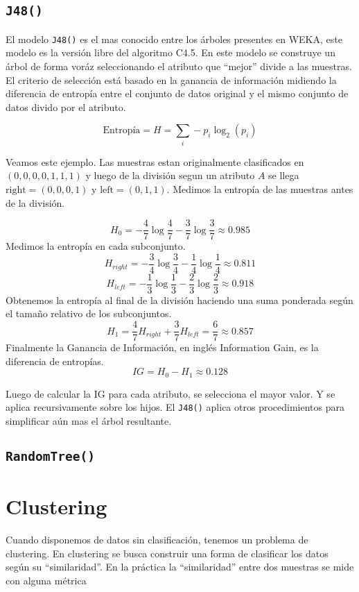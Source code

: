 \documentclass[10pt,a4paper]{article}
\begin{document}
\subsection{\lstinline{J48()}}
El modelo \lstinline{J48()} es el mas conocido entre los árboles presentes en WEKA, este modelo es la versión libre del algoritmo C4.5. En este modelo se construye un árbol de forma voráz seleccionando el atributo que ``mejor'' divide a las muestras. El criterio de selección está basado en la ganancia de información midiendo la diferencia de entropía entre el conjunto de datos original y el mismo conjunto de datos divido por el atributo.

\[
\text{Entropía} = H = \sum_i -p_i \log_2(p_i)
\]

Veamos este ejemplo. Las muestras estan originalmente clasificados en $(0, 0, 0, 0, 1, 1, 1)$ y luego de la división segun un atributo $A$ se llega $\text{right}=(0, 0, 0, 1)$ y $\text{left}=(0, 1, 1)$. Medimos la entropía de las muestras antes de la división.

\[
H_0 = -\frac{4}{7} \log\frac{4}{7} -\frac{3}{7} \log\frac{3}{7} \approx 0.985
\]
Medimos la entropía en cada subconjunto.
\[
H_{right} = -\frac{3}{4} \log\frac{3}{4} - \frac{1}{4} \log\frac{1}{4} \approx 0.811
\]
\[
H_{left} = -\frac{1}{3} \log\frac{1}{3} - \frac{2}{3} \log\frac{2}{3} \approx 0.918
\]
Obtenemos la entropía al final de la división haciendo una suma ponderada según el tamaño relativo de los subconjuntos.
\[
H_1 = \frac{4}{7}H_{right} + \frac{3}{7}H_{left} = \frac{6}{7} \approx 0.857
\]
Finalmente la Ganancia de Información, en inglés Information Gain, es la diferencia de entropías.
\[
IG = H_0 - H_1 \approx 0.128
\]

Luego de calcular la IG para cada atributo, se selecciona el mayor valor. Y se aplica recursivamente sobre los hijos. El \lstinline{J48()} aplica otros procedimientos para simplificar aún mas el árbol resultante.

\subsection{\lstinline{RandomTree()}}

\section{Clustering}
Cuando disponemos de datos sin clasificación, tenemos un problema de clustering. En clustering se busca construir una forma de clasificar los datos según su ``similaridad''. En la práctica la ``similaridad'' entre dos muestras se mide con alguna métrica %
\end{document}
